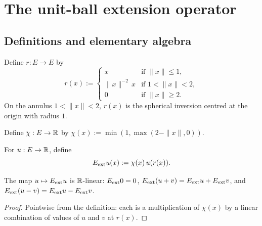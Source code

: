 \section{The unit-ball extension operator}

\subsection*{Definitions and elementary algebra}

\begin{definition}
\label{def:unitBallRetraction}
\leanok
Define $r : E \to E$ by
\begin{equation*}
r(x) := \begin{cases}
x & \text{if } \|x\| \le 1, \\
\|x\|^{-2}\, x & \text{if } 1 < \|x\| < 2, \\
0 & \text{if } \|x\| \ge 2.
\end{cases}
\end{equation*}
On the annulus $1 < \|x\| < 2$, $r(x)$ is the spherical inversion centred at
the origin with radius $1$.
\end{definition}

\begin{definition}
\label{def:unitBallCutoff}
\leanok
Define $\chi : E \to \mathbb{R}$ by $\chi(x) := \min(1, \max(2 - \|x\|, 0))$.
\end{definition}

\begin{definition}
\label{def:unitBallExtension}
\leanok
{}
For $u : E \to \mathbb{R}$, define
\begin{equation*}
E_{\mathrm{ext}} u (x) := \chi(x)\, u(r(x)).
\end{equation*}
\end{definition}

\begin{lemma}
\label{lem:unitBallExtension_zero}
\leanok
{}
The map $u \mapsto E_{\mathrm{ext}} u$ is $\mathbb{R}$-linear: $E_{\mathrm{ext}} 0 = 0$,
$E_{\mathrm{ext}}{(u+v)} = E_{\mathrm{ext}} u + E_{\mathrm{ext}} v$, and $E_{\mathrm{ext}}{(u-v)} = E_{\mathrm{ext}} u - E_{\mathrm{ext}} v$.
\end{lemma}

\begin{proof}
\leanok

Pointwise from the definition: each is a multiplication of $\chi(x)$ by a
linear combination of values of $u$ and $v$ at $r(x)$.
\end{proof}


